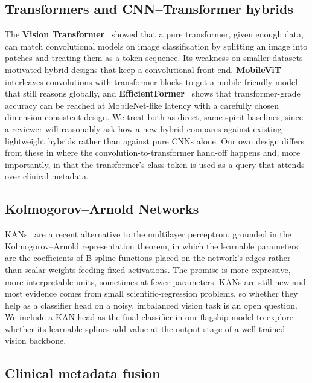 \subsection{Transformers and CNN--Transformer hybrids}

The \textbf{Vision Transformer}~\cite{dosovitskiy2021vit} showed that a pure
transformer, given enough data, can match convolutional models on image
classification by splitting an image into patches and treating them as a token
sequence. Its weakness on smaller datasets motivated hybrid designs that keep a
convolutional front end. \textbf{MobileViT}~\cite{mehta2022mobilevit} interleaves
convolutions with transformer blocks to get a mobile-friendly model that still
reasons globally, and \textbf{EfficientFormer}~\cite{li2022efficientformer} shows
that transformer-grade accuracy can be reached at MobileNet-like latency with a
carefully chosen dimension-consistent design. We treat both as direct,
same-spirit baselines, since a reviewer will reasonably ask how a new hybrid
compares against existing lightweight hybrids rather than against pure CNNs
alone. Our own design differs from these in where the convolution-to-transformer
hand-off happens and, more importantly, in that the transformer's class token is
used as a query that attends over clinical metadata.

\subsection{Kolmogorov--Arnold Networks}

KANs~\cite{liu2024kan} are a recent alternative to the multilayer perceptron,
grounded in the Kolmogorov--Arnold representation theorem, in which the learnable
parameters are the coefficients of B-spline functions placed on the network's
edges rather than scalar weights feeding fixed activations. The promise is more
expressive, more interpretable units, sometimes at fewer parameters. KANs are
still new and most evidence comes from small scientific-regression problems, so
whether they help as a classifier head on a noisy, imbalanced vision task is an
open question. We include a KAN head as the final classifier in our flagship
model to explore whether its learnable splines add value at the output stage of
a well-trained vision backbone.

\subsection{Clinical metadata fusion}

